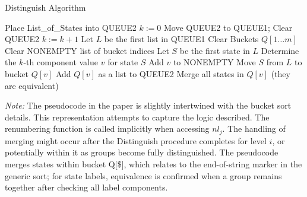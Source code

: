 \begin{algorithm} 
    \caption{Distinguish Algorithm} \label{alg:distinguish}
    \begin{algorithmic}[1] 
        \State Place List\_of\_States into QUEUE2 
        \State $k := 0$ 
        \Repeat
            \State Move QUEUE2 to QUEUE1; Clear QUEUE2
            \State $k := k + 1$
                \State Let $L$ be the first list in QUEUE1
                \State Clear Buckets $Q[1 \dots m]$ 
                \State Clear NONEMPTY list of bucket indices
                    \State Let $S$ be the first state in $L$
                    \State Determine the $k$-th component value $v$ for state $S$
                        \State Add $v$ to NONEMPTY
                    \EndIf
                    \State Move $S$ from $L$ to bucket $Q[v]$
                \EndWhile
                        \State Add $Q[v]$ as a list to QUEUE2 
                        \State Merge all states in $Q[v]$ (they are equivalent)
                    \EndIf
                \EndFor
            \EndWhile
         
        \EndFunction
    \end{algorithmic}
\end{algorithm}

\textit{Note:} The pseudocode in the paper is slightly intertwined with the bucket sort details. This representation attempts to capture the logic described. The renumbering function is called implicitly when accessing $nl_j$. The handling of merging might occur after the Distinguish procedure completes for level $i$, or potentially within it as groups become fully distinguished. The pseudocode merges states within bucket Q[\$], which relates to the end-of-string marker in the generic sort; for state labels, equivalence is confirmed when a group remains together after checking all label components.
